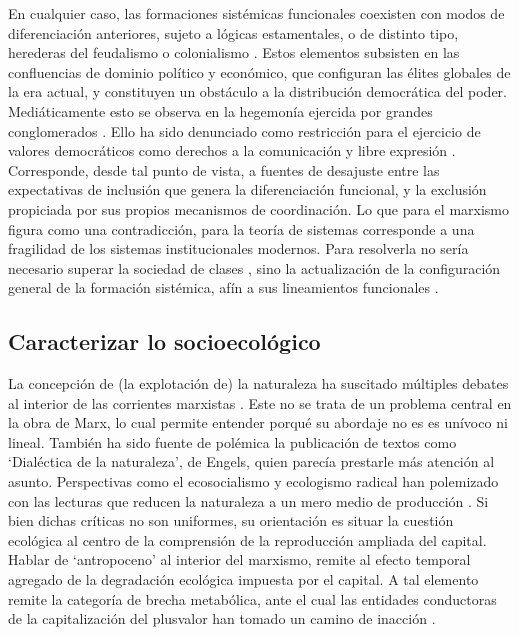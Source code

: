 \documentclass{textolivre}
\begin{document}
En cualquier caso, las formaciones sistémicas funcionales coexisten con modos de
diferenciación anteriores, sujeto a lógicas estamentales, o de distinto tipo, herederas del
feudalismo o colonialismo \cite{Mascareo2018}. Estos elementos subsisten en las
confluencias de dominio político y económico, que configuran las élites globales de la era
actual, y constituyen un obstáculo a la distribución democrática del poder. Mediáticamente
esto se observa en la hegemonía ejercida por grandes conglomerados \cite{mosco2016}. 
Ello ha sido denunciado como restricción para el ejercicio de valores democráticos
como derechos a la comunicación y libre expresión \cite{Santander2014,sapiezynska2013}.
Corresponde, desde tal punto de vista, a fuentes de desajuste
entre las expectativas de inclusión que genera la diferenciación funcional, y la exclusión
propiciada por sus propios mecanismos de coordinación. Lo que para el marxismo figura
como una contradicción, para la teoría de sistemas corresponde a una fragilidad de los
sistemas institucionales modernos. Para resolverla no sería necesario superar la sociedad
de clases \cite{lenin1997}, sino la actualización de la configuración general de la formación
sistémica, afín a sus lineamientos funcionales \cite{Luhmann2007,Tkke2010}.



\subsection{Caracterizar lo socioecológico}\label{sec-caracterizar}

La concepción de (la explotación de) la naturaleza ha suscitado múltiples debates
al interior de las corrientes marxistas \cite{arboleda}. Este no se trata de un
problema central en la obra de Marx, lo cual permite entender porqué su abordaje no es
es unívoco ni lineal. También ha sido fuente de polémica la publicación de textos como
‘Dialéctica de la naturaleza’, de Engels, quien parecía prestarle más atención al asunto.
Perspectivas como el ecosocialismo y ecologismo radical han polemizado con las lecturas
que reducen la naturaleza a un mero medio de producción \cite{Foster2016}. Si bien
dichas críticas no son uniformes, su orientación es situar la cuestión ecológica al centro
de la comprensión de la reproducción ampliada del capital. Hablar de ‘antropoceno’ al
interior del marxismo, remite al efecto temporal agregado de la degradación ecológica
impuesta por el capital. A tal elemento remite la categoría de brecha metabólica, ante el
cual las entidades conductoras de la capitalización del plusvalor han tomado un camino
de inacción \cite{Gunderson2019}.
\end{document}
